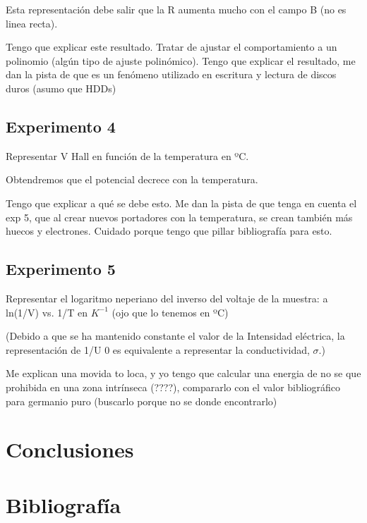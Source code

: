 Esta representación debe salir que la R aumenta mucho con el campo B (no es linea recta). 

Tengo que explicar este resultado. Tratar de ajustar el comportamiento a un polinomio (algún tipo de ajuste polinómico). Tengo que explicar el resultado, me dan la pista de que es un fenómeno utilizado en escritura y lectura de discos duros (asumo que HDDs)



\subsection{Experimento 4}

Representar V Hall en función de la temperatura en ºC.

Obtendremos que el potencial decrece con la temperatura. 

Tengo que explicar a qué se debe esto. Me dan la pista de que tenga en cuenta el exp 5, que al crear nuevos portadores con la temperatura, se crean también más huecos y electrones. Cuidado porque tengo que pillar bibliografía para esto.


\subsection{Experimento 5}

Representar el logaritmo neperiano del inverso del voltaje de la muestra: a ln(1/V) vs. 1/T en $K^{-1}$ (ojo que lo tenemos en ºC)

(Debido a que se ha mantenido constante el valor de la Intensidad eléctrica, la representación de
1/U 0 es equivalente a representar la conductividad, $\sigma$.)


Me explican una movida to loca, y yo tengo que calcular una energia de no se que prohibida en una zona intrínseca (????), compararlo con el valor bibliográfico para germanio puro (buscarlo porque no se donde encontrarlo)



\section{Conclusiones}





\section{Bibliografía}











